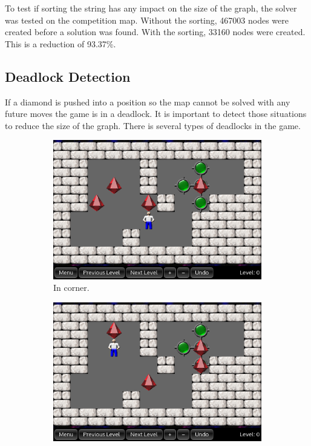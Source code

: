 To test if sorting the string has any impact on the size of the graph, the solver was tested on the competition map.
Without the sorting, 467003 nodes were created before a solution was found.
With the sorting, 33160 nodes were created. 
This is a reduction of 93.37\%.

\subsection{Deadlock Detection}
If a diamond is pushed into a position so the map cannot be solved with any future moves the game is in a deadlock.
It is important to detect those situations to reduce the size of the graph.
There is several types of deadlocks in the game.

\begin{figure}[h]
\centering
\begin{subfigure}{0.3\textwidth}
  \centering
  \includegraphics[width=\linewidth]{img/deadlock_corner}
  \caption{In corner.}
  \label{fig:deadlock_corner}
\end{subfigure}
%
\begin{subfigure}{0.3\textwidth}
  \centering
  \includegraphics[width=\linewidth]{img/deadlock_wall}

\end{subfigure}
\end{figure}
